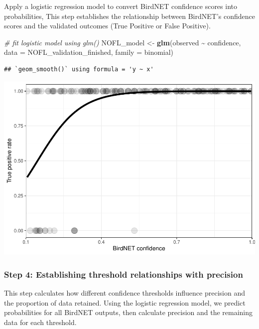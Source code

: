 \documentclass[
]{article}
\newenvironment{Shaded}{\begin{snugshade}}{\end{snugshade}}
\newcommand{\AttributeTok}[1]{\textcolor[rgb]{0.13,0.29,0.53}{#1}}
\newcommand{\CommentTok}[1]{\textcolor[rgb]{0.56,0.35,0.01}{\textit{#1}}}
\newcommand{\FunctionTok}[1]{\textcolor[rgb]{0.13,0.29,0.53}{\textbf{#1}}}
\newcommand{\NormalTok}[1]{#1}
\newcommand{\OtherTok}[1]{\textcolor[rgb]{0.56,0.35,0.01}{#1}}
\newcommand{\SpecialCharTok}[1]{\textcolor[rgb]{0.81,0.36,0.00}{\textbf{#1}}}
\begin{document}
Apply a logistic regression model to convert BirdNET confidence scores
into probabilities, This step establishes the relationship between
BirdNET's confidence scores and the validated outcomes (True Positive or
False Positive).

\begin{Shaded}
\begin{Highlighting}[]
\CommentTok{\# fit logistic model using glm()}
\NormalTok{NOFL\_model }\OtherTok{\textless{}{-}} \FunctionTok{glm}\NormalTok{(observed }\SpecialCharTok{\textasciitilde{}}\NormalTok{ confidence, }
                  \AttributeTok{data =}\NormalTok{ NOFL\_validation\_finished, }
                  \AttributeTok{family =}\NormalTok{ binomial)}
\end{Highlighting}
\end{Shaded}

\begin{verbatim}
## `geom_smooth()` using formula = 'y ~ x'
\end{verbatim}

\includegraphics{species_specific_method_tutorial_files/figure-latex/unnamed-chunk-5-1.pdf}

\subsubsection{Step 4: Establishing threshold relationships with
precision}\label{step-4-establishing-threshold-relationships-with-precision}

This step calculates how different confidence thresholds influence
precision and the proportion of data retained. Using the logistic
regression model, we predict probabilities for all BirdNET outputs, then
calculate precision and the remaining data for each threshold.
\end{document}
